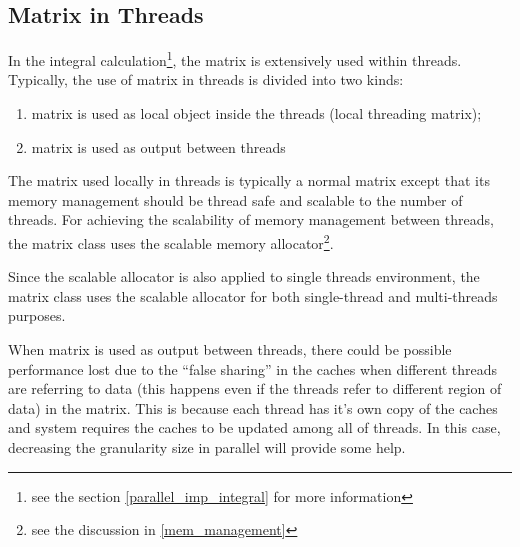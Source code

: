 \subsection{Matrix in Threads}
%
%
%
\label{matrix_threads}

In the integral calculation\footnote{see the section \ref{parallel_imp_integral}
for more information}, the matrix is extensively used within threads. Typically,
the use of matrix in threads is divided into two kinds:
\begin{enumerate}
 \item matrix is used as local object inside the threads (local threading matrix);
 \item matrix is used as output between threads
\end{enumerate}

The matrix used locally in threads is typically a normal matrix except that
its memory management should be thread safe and scalable to the number of 
threads. For achieving the scalability of memory management between threads,
the matrix class uses the scalable memory allocator\footnote{see the discussion
in \ref{mem_management}}.

Since the scalable allocator is also applied to single threads environment,
the matrix class uses the scalable allocator for both single-thread and 
multi-threads purposes.

When matrix is used as output between threads, there could be possible performance 
lost due to the ``false sharing'' in the caches when different threads are 
referring to data (this happens even if the threads refer to different region
of data) in the matrix. This is because each thread has it's own copy of the caches
and system requires the caches to be updated among all of threads. In this case,
decreasing the granularity size in parallel will provide some help. 



